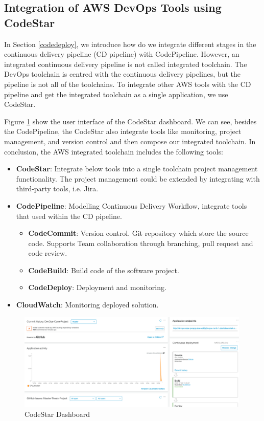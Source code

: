 \subsection{Integration of AWS DevOps Tools using CodeStar}
In Section \ref{codedeploy}, we introduce how do we integrate different stages in the continuous delivery pipeline (CD pipeline) with CodePipeline. However, an integrated continuous delivery pipeline is not called integrated toolchain. The DevOps toolchain is centred with the continuous delivery pipelines, but the pipeline is not all of the toolchains. To integrate other AWS tools with the CD pipeline and get the integrated toolchain as a single application, we use CodeStar.  
\par
Figure \ref{fig:codestar} show the user interface of the CodeStar dashboard. We can see, besides the CodePipeline, the CodeStar also integrate tools like monitoring, project management, and version control and then compose our integrated toolchain. In conclusion, the AWS integrated toolchain includes the following tools:\label{codestar}
\begin{itemize}
     \item \textbf{CodeStar}: Integrate below tools into a single toolchain project management functionality. The project management could be extended by integrating with third-party tools, i.e. Jira.
          \item \textbf{CodePipeline}: Modelling Continuous Delivery Workflow, integrate tools that used within the CD pipeline.
          \begin{itemize}
               \item \textbf{CodeCommit}: Version control. Git repository which store the source code. Supports Team collaboration through branching, pull request and code review.
               \item \textbf{CodeBuild}: Build code of the software project.
               \item \textbf{CodeDeploy}: Deployment and monitoring. 
          \end{itemize}
          \item \textbf{CloudWatch}: Monitoring deployed solution.
\end{itemize}
\begin{figure}[h]
     \centering
     \includegraphics[width=0.99\textwidth]{pics/codestar.png}
     \caption{CodeStar Dashboard}
     \label{fig:codestar}
    \end{figure}

